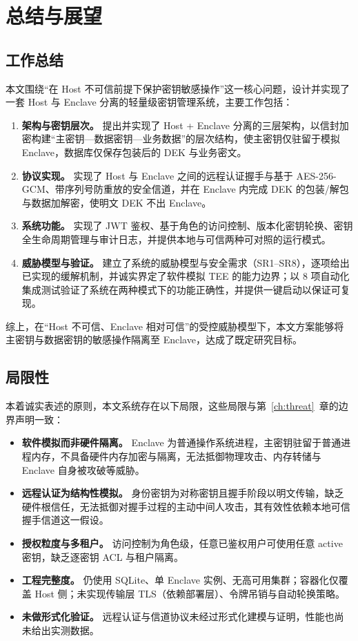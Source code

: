 \chapter{总结与展望}
\label{ch:conclusion}

\section{工作总结}

本文围绕“在 Host 不可信前提下保护密钥敏感操作”这一核心问题，设计并实现了一套 Host 与 Enclave 分离的轻量级密钥管理系统，主要工作包括：

\begin{enumerate}
  \item \textbf{架构与密钥层次。} 提出并实现了 Host + Enclave 分离的三层架构，以信封加密构建“主密钥—数据密钥—业务数据”的层次结构，使主密钥仅驻留于模拟 Enclave，数据库仅保存包装后的 DEK 与业务密文。
  \item \textbf{协议实现。} 实现了 Host 与 Enclave 之间的远程认证握手与基于 AES-256-GCM、带序列号防重放的安全信道，并在 Enclave 内完成 DEK 的包装/解包与数据加解密，使明文 DEK 不出 Enclave。
  \item \textbf{系统功能。} 实现了 JWT 鉴权、基于角色的访问控制、版本化密钥轮换、密钥全生命周期管理与审计日志，并提供本地与可信两种可对照的运行模式。
  \item \textbf{威胁模型与验证。} 建立了系统的威胁模型与安全需求（SR1--SR8），逐项给出已实现的缓解机制，并诚实界定了软件模拟 TEE 的能力边界；以 8 项自动化集成测试验证了系统在两种模式下的功能正确性，并提供一键启动以保证可复现。
\end{enumerate}

综上，在“Host 不可信、Enclave 相对可信”的受控威胁模型下，本文方案能够将主密钥与数据密钥的敏感操作隔离至 Enclave，达成了既定研究目标。

\section{局限性}

本着诚实表述的原则，本文系统存在以下局限，这些局限与第~\ref{ch:threat}~章的边界声明一致：

\begin{itemize}
  \item \textbf{软件模拟而非硬件隔离。} Enclave 为普通操作系统进程，主密钥驻留于普通进程内存，不具备硬件内存加密与隔离，无法抵御物理攻击、内存转储与 Enclave 自身被攻破等威胁。
  \item \textbf{远程认证为结构性模拟。} 身份密钥为对称密钥且握手阶段以明文传输，缺乏硬件根信任，无法抵御对握手过程的主动中间人攻击，其有效性依赖本地可信握手信道这一假设。
  \item \textbf{授权粒度与多租户。} 访问控制为角色级，任意已鉴权用户可使用任意 active 密钥，缺乏逐密钥 ACL 与租户隔离。
  \item \textbf{工程完整度。} 仍使用 SQLite、单 Enclave 实例、无高可用集群；容器化仅覆盖 Host 侧；未实现传输层 TLS（依赖部署层）、令牌吊销与自动轮换策略。
  \item \textbf{未做形式化验证。} 远程认证与信道协议未经过形式化建模与证明，性能也尚未给出实测数据。
\end{itemize}

